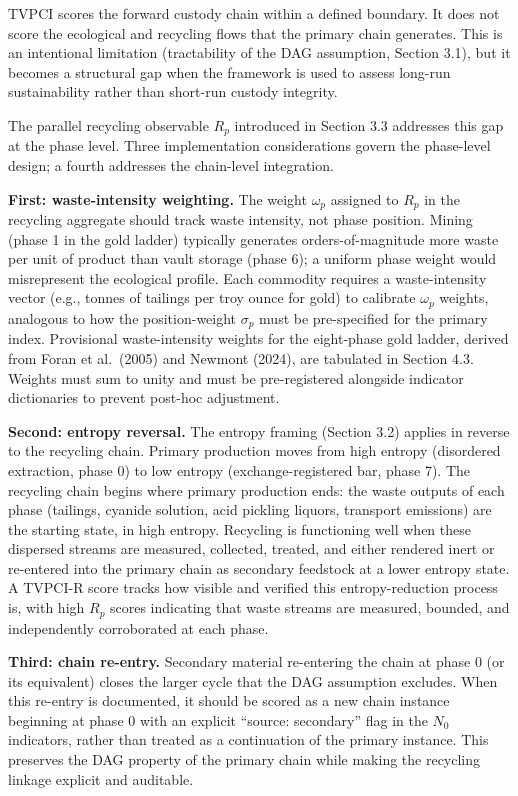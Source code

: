 \documentclass[
  11pt,
  letterpaper,
]{article}
\begin{document}
TVPCI scores the forward custody chain within a defined boundary. It
does not score the ecological and recycling flows that the primary chain
generates. This is an intentional limitation (tractability of the DAG
assumption, Section 3.1), but it becomes a structural gap when the
framework is used to assess long-run sustainability rather than
short-run custody integrity.

The parallel recycling observable \(R_p\) introduced in Section 3.3
addresses this gap at the phase level. Three implementation
considerations govern the phase-level design; a fourth addresses the
chain-level integration.

\textbf{First: waste-intensity weighting.} The weight \(\omega_p\)
assigned to \(R_p\) in the recycling aggregate should track waste
intensity, not phase position. Mining (phase 1 in the gold ladder)
typically generates orders-of-magnitude more waste per unit of product
than vault storage (phase 6); a uniform phase weight would misrepresent
the ecological profile. Each commodity requires a waste-intensity vector
(e.g., tonnes of tailings per troy ounce for gold) to calibrate
\(\omega_p\) weights, analogous to how the position-weight \(\sigma_p\)
must be pre-specified for the primary index. Provisional waste-intensity
weights for the eight-phase gold ladder, derived from Foran et
al.~(2005) and Newmont (2024), are tabulated in Section 4.3. Weights
must sum to unity and must be pre-registered alongside indicator
dictionaries to prevent post-hoc adjustment.

\textbf{Second: entropy reversal.} The entropy framing (Section 3.2)
applies in reverse to the recycling chain. Primary production moves from
high entropy (disordered extraction, phase 0) to low entropy
(exchange-registered bar, phase 7). The recycling chain begins where
primary production ends: the waste outputs of each phase (tailings,
cyanide solution, acid pickling liquors, transport emissions) are the
starting state, in high entropy. Recycling is functioning well when
these dispersed streams are measured, collected, treated, and either
rendered inert or re-entered into the primary chain as secondary
feedstock at a lower entropy state. A TVPCI-R score tracks how visible
and verified this entropy-reduction process is, with high \(R_p\) scores
indicating that waste streams are measured, bounded, and independently
corroborated at each phase.

\textbf{Third: chain re-entry.} Secondary material re-entering the chain
at phase 0 (or its equivalent) closes the larger cycle that the DAG
assumption excludes. When this re-entry is documented, it should be
scored as a new chain instance beginning at phase 0 with an explicit
``source: secondary'' flag in the \(N_0\) indicators, rather than
treated as a continuation of the primary instance. This preserves the
DAG property of the primary chain while making the recycling linkage
explicit and auditable.
\end{document}
